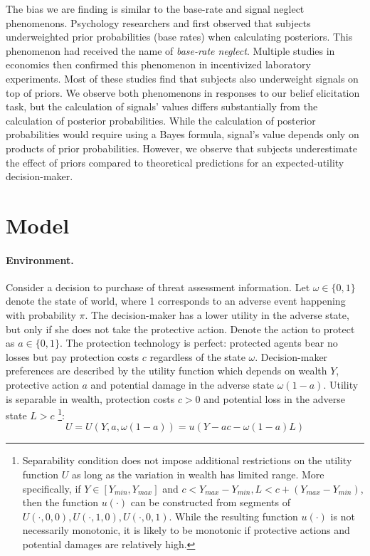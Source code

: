 \documentclass[12pt,a4paper]{article}
\begin{document}
The bias we are finding is similar to the base-rate and signal neglect phenomenons. Psychology researchers \citet{hammerton_case_1973} and \citet{kahneman_psychology_1973} first observed that subjects underweighted prior probabilities (base rates) when calculating posteriors. This phenomenon had received the name of \textit{base-rate neglect}. Multiple studies in economics then confirmed \citep*{grether_testing_1992, holt_update_2009} this phenomenon in incentivized laboratory experiments. Most of these studies find that subjects also underweight signals on top of priors.  We observe both phenomenons in responses to our belief elicitation task, but the calculation of signals' values differs substantially from the calculation of posterior probabilities. While the calculation of posterior probabilities would require using a Bayes formula, signal's value depends only on products of prior probabilities. However, we observe that subjects underestimate the effect of priors compared to theoretical predictions for an expected-utility decision-maker.


\vspace{20pt}

\section{Model}
\paragraph{Environment.} Consider a decision to purchase of threat assessment information. Let $\omega \in \{0,1\}$ denote the state of world, where 1 corresponds to an adverse event happening with probability $\pi$. The decision-maker has a lower utility in the adverse state, but only if she does not take the protective action. Denote the action to protect as $a\in\{0,1\}$. The protection technology is perfect: protected agents bear no losses but pay protection costs $c$ regardless of the state $\omega$. Decision-maker preferences are described by the utility function which depends on wealth $Y$, protective action $a$ and potential damage in the adverse state $\omega(1-a)$. Utility is separable in wealth, protection costs $c>0$ and potential loss in the adverse state $L>c$ \footnote{Separability condition does not impose additional restrictions on the utility function $U$ as long as the variation in wealth has limited range. More specifically, if $Y \in [Y_{min},Y_{max}]$ and $c<Y_{max}-Y_{min}, L<c+(Y_{max}-Y_{min})$, then the function $u(\cdot)$ can be constructed from segments of $U(\cdot,0,0), U(\cdot,1,0), U(\cdot,0,1)$.  While the resulting function $u(\cdot)$ is not necessarily monotonic, it is likely to be monotonic if protective actions and potential damages are relatively high.}:
\begin{equation}
U=U(Y,a,\omega(1-a))=u(Y-ac-\omega(1-a)L)
\end{equation}
\end{document}
